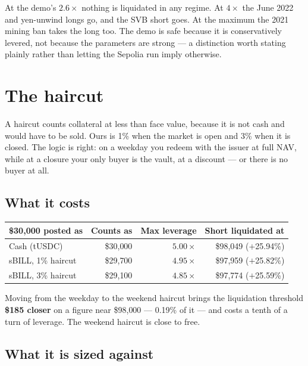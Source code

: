 \documentclass[11pt,a4paper]{article}
\begin{document}
At the demo's $2.6\times$ nothing is liquidated in any regime. At $4\times$ the June 2022
and yen-unwind longs go, and the SVB short goes. At the maximum the 2021 mining ban takes
the long too. The demo is safe because it is conservatively levered, not because the
parameters are strong — a distinction worth stating plainly rather than letting the
Sepolia run imply otherwise.

\section{The haircut}

A haircut counts collateral at less than face value, because it is not cash and would have
to be sold. Ours is 1\% when the market is open and 3\% when it is closed. The logic is
right: on a weekday you redeem with the issuer at full NAV, while at a closure your only
buyer is the vault, at a discount — or there is no buyer at all.

\subsection{What it costs}

\begin{center}
\small
\begin{tabular}{@{}lrrr@{}}
\toprule
\textbf{\$30{,}000 posted as} & \textbf{Counts as} & \textbf{Max leverage} & \textbf{Short liquidated at} \\
\midrule
Cash (tUSDC)        & \$30{,}000 & $5.00\times$ & \$98{,}049 ($+$25.94\%) \\
sBILL, 1\% haircut  & \$29{,}700 & $4.95\times$ & \$97{,}959 ($+$25.82\%) \\
sBILL, 3\% haircut  & \$29{,}100 & $4.85\times$ & \$97{,}774 ($+$25.59\%) \\
\bottomrule
\end{tabular}
\end{center}

Moving from the weekday to the weekend haircut brings the liquidation threshold
\textbf{\$185 closer} on a figure near \$98{,}000 — 0.19\% of it — and costs a tenth of a
turn of leverage. The weekend haircut is close to free.

\subsection{What it is sized against}
\end{document}
